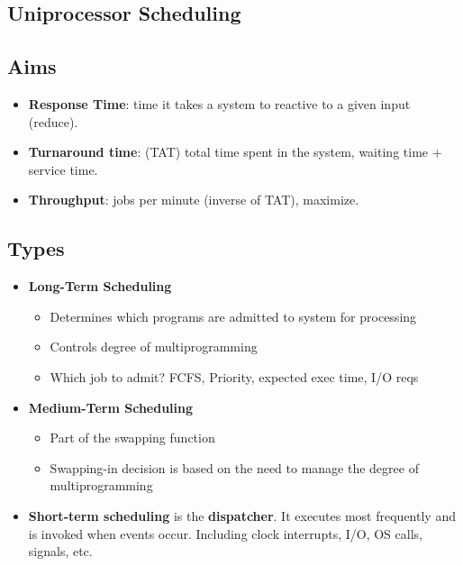 \documentclass[fontsize=4.5pt]{scrartcl}
\begin{document}
\begin{multicols}{3}
  \section{Uniprocessor Scheduling}
    \subsection{Aims}
      \begin{itemize}
       \item \textbf{Response Time}: time it takes a system to reactive to a given input (reduce).
       \item \textbf{Turnaround time}: (TAT) total time spent in the system, waiting time + service time.
       \item \textbf{Throughput}: jobs per minute (inverse of TAT), maximize.
      \end{itemize}
      \subsection{Types}
      \begin{itemize}
       \item \textbf{Long-Term Scheduling}
       \begin{itemize}
         \item Determines which programs are admitted to system for processing
         \item Controls degree of multiprogramming
         \item Which job to admit? FCFS, Priority, expected exec time, I/O reqs
       \end{itemize}
       \item \textbf{Medium-Term Scheduling}
       \begin{itemize}
         \item Part of the swapping function
         \item Swapping-in decision is based on the need to manage the degree of multiprogramming
       \end{itemize}
       \item \textbf{Short-term scheduling} is the \textbf{dispatcher}. It executes most frequently and is invoked when events occur. Including clock interrupts, I/O, OS calls, signals, etc.
      \end{itemize}

\end{multicols}
\end{document}
